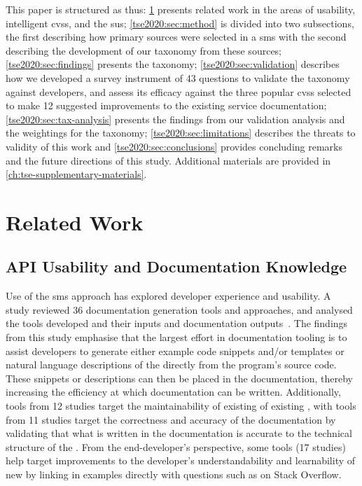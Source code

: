 This paper is structured as thus: \cref{tse2020:sec:related-work} presents related work in the areas of  usability, intelligent \glspl{cvs}, and the \gls{sus}; \cref{tse2020:sec:method} is divided into two subsections, the first describing how primary sources were selected in a \gls{sms} with the second describing the development of our taxonomy from these sources; \cref{tse2020:sec:findings} presents the taxonomy; \cref{tse2020:sec:validation} describes how we developed a survey instrument of 43 questions to validate the taxonomy against developers, and assess its efficacy against the three popular \glspl{cvs} selected to make 12 suggested improvements to the existing service  documentation; \cref{tse2020:sec:tax-analysis} presents the findings from our validation analysis and the weightings for the taxonomy; \cref{tse2020:sec:limitations} describes the threats to validity of this work and \cref{tse2020:sec:conclusions} provides concluding remarks and the future directions of this study. Additional materials are provided in \cref{ch:tse-supplementary-materials}.

\section{Related Work}
\label{tse2020:sec:related-work}



\subsection{API Usability and Documentation Knowledge}

Use of the \gls{sms} approach has explored developer experience and  usability. A~\citeyear{Nybom:2018ef} study reviewed 36  documentation generation tools and approaches, and analysed the tools developed and their inputs and documentation outputs~\citep{Nybom:2018ef}. The findings from this study emphasise that the largest effort in  documentation tooling is to assist developers to generate either example code snippets and/or templates or natural language descriptions of the  directly from the program's source code. These snippets or descriptions can then be placed in the  documentation, thereby increasing the efficiency at which  documentation can be written. Additionally, tools from 12 studies target the maintainability of existing  of existing , with tools from 11 studies target the correctness and accuracy of the documentation by validating that what is written in the documentation is accurate to the technical structure of the . From the end-developer's perspective, some tools (17 studies) help target improvements to the developer's understandability and learnability of new  by linking in examples directly with questions such as on Stack Overflow.

